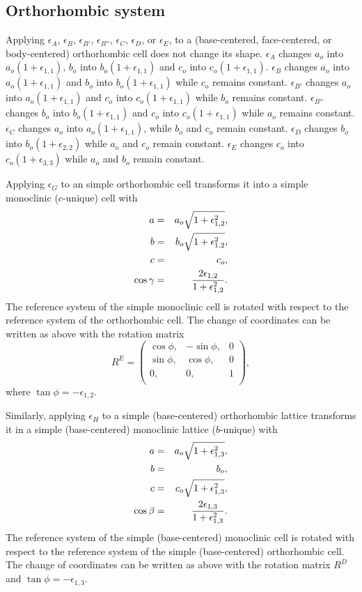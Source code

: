 \documentclass[12pt,a4paper]{article}
\begin{document}
\subsection{\color{web-blue}Orthorhombic system}
Applying $\epsilon_A$, $\epsilon_B$, $\epsilon_{B'}$, $\epsilon_{B''}$, 
$\epsilon_C$, $\epsilon_D$, or $\epsilon_E$, to a (base-centered, 
face-centered, or body-centered) orthorhombic cell does not change its shape. 
$\epsilon_A$ changes $a_o$ into $a_o(1+\epsilon_{1,1})$, $b_o$ into
$b_o(1+\epsilon_{1,1})$ and $c_o$ into $c_o(1+\epsilon_{1,1})$.
$\epsilon_B$ changes $a_o$ into $a_o(1+\epsilon_{1,1})$ and $b_o$ into
$b_o(1+\epsilon_{1,1})$ while $c_o$ remains constant.
$\epsilon_{B'}$ changes $a_o$ into $a_o(1+\epsilon_{1,1})$ and $c_o$ into
$c_o(1+\epsilon_{1,1})$ while $b_o$ remains constant.
$\epsilon_{B''}$ changes $b_o$ into $b_o(1+\epsilon_{1,1})$ and $c_o$ into
$c_o(1+\epsilon_{1,1})$ while $a_o$ remains constant.
$\epsilon_C$ changes $a_o$ into 
$a_o(1+\epsilon_{1,1})$, while $b_o$ and $c_o$ remain constant.
$\epsilon_D$ changes $b_o$ into $b_o(1+\epsilon_{2,2})$ while
$a_o$ and $c_o$ remain constant.
$\epsilon_E$ changes $c_o$ into $c_o(1+\epsilon_{3,3})$ while $a_o$ and
$b_o$ remain constant.

Applying $\epsilon_G$ to an simple orthorhombic cell transforms it into a 
simple monoclinic ($c$-unique) cell with
\begin{eqnarray}
a&=&a_o \sqrt{1+\epsilon_{1,2}^2}, \\
b&=&b_o \sqrt{1+\epsilon_{1,2}^2}, \\
c&=&c_o, \\
\cos\gamma &=& {2 \epsilon_{1,2} \over 1 + \epsilon_{1,2}^2}.
\end{eqnarray}
The reference system of the simple monoclinic cell is rotated with respect to
the reference system of the orthorhombic cell. 
The change of coordinates can be written as above with the rotation matrix 
\begin{equation}
R^E=\left( \begin{array}{ccc}
\cos\phi, & -\sin\phi, & 0 \\
\sin\phi, &  \cos\phi, & 0 \\
0, & 0, & 1 \\
\end{array}
\right),
\end{equation}
where $\tan \phi=-\epsilon_{1,2}$.

Similarly, applying $\epsilon_H$ to a simple (base-centered) 
orthorhombic lattice transforms
it in a simple (base-centered) monoclinic lattice ($b$-unique) with 
\begin{eqnarray}
a&=&a_o \sqrt{1+\epsilon_{1,3}^2}, \\
b&=&b_o, \\
c&=&c_o \sqrt{1+\epsilon_{1,3}^2}, \\
\cos\beta &=& {2 \epsilon_{1,3} \over 1 + \epsilon_{1,3}^2}. 
\end{eqnarray}
The reference system of the simple (base-centered) monoclinic cell is 
rotated with respect to the reference system of the simple (base-centered) 
orthorhombic cell. 
The change of coordinates can be written as above with the rotation matrix 
$R^D$ and $\tan \phi=-\epsilon_{1,3}$.
\end{document}

